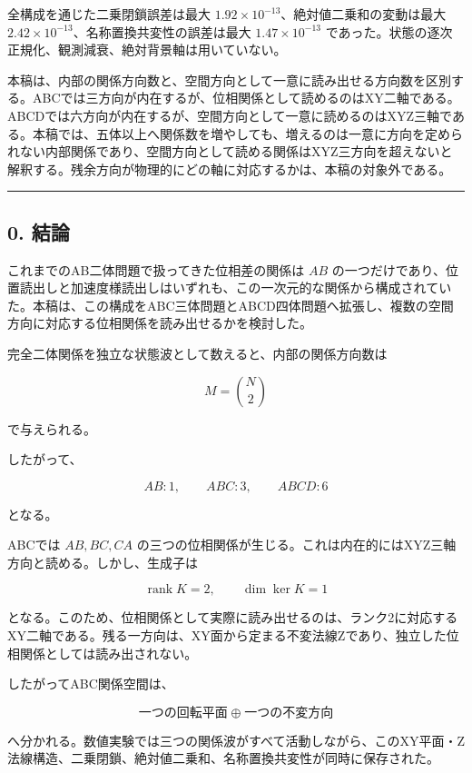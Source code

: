 \documentclass[
  10pt,
  a4paper,
]{article}
\begin{document}
全構成を通じた二乗閉鎖誤差は最大
\(1.92\times10^{-13}\)、絶対値二乗和の変動は最大
\(2.42\times10^{-13}\)、名称置換共変性の誤差は最大
\(1.47\times10^{-13}\)
であった。状態の逐次正規化、観測減衰、絶対背景軸は用いていない。

本稿は、内部の関係方向数と、空間方向として一意に読み出せる方向数を区別する。ABCでは三方向が内在するが、位相関係として読めるのはXY二軸である。ABCDでは六方向が内在するが、空間方向として一意に読めるのはXYZ三軸である。本稿では、五体以上へ関係数を増やしても、増えるのは一意に方向を定められない内部関係であり、空間方向として読める関係はXYZ三方向を超えないと解釈する。残余方向が物理的にどの軸に対応するかは、本稿の対象外である。

\begin{center}\rule{0.5\linewidth}{0.5pt}\end{center}

\subsection{0. 結論}\label{ux7d50ux8ad6}

これまでのAB二体問題で扱ってきた位相差の関係は \(AB\)
の一つだけであり、位置読出しと加速度様読出しはいずれも、この一次元的な関係から構成されていた。本稿は、この構成をABC三体問題とABCD四体問題へ拡張し、複数の空間方向に対応する位相関係を読み出せるかを検討した。

完全二体関係を独立な状態波として数えると、内部の関係方向数は

\[
M=\binom{N}{2}
\]

で与えられる。

したがって、

\[
AB:1,
\qquad
ABC:3,
\qquad
ABCD:6
\]

となる。

ABCでは \(AB,BC,CA\)
の三つの位相関係が生じる。これは内在的にはXYZ三軸方向と読める。しかし、生成子は

\[
\operatorname{rank}K=2,
\qquad
\dim\ker K=1
\]

となる。このため、位相関係として実際に読み出せるのは、ランク2に対応するXY二軸である。残る一方向は、XY面から定まる不変法線Zであり、独立した位相関係としては読み出されない。

したがってABC関係空間は、

\[
\boxed{
\text{一つの回転平面}
\;\oplus\;
\text{一つの不変方向}
}
\]

へ分かれる。数値実験では三つの関係波がすべて活動しながら、このXY平面・Z法線構造、二乗閉鎖、絶対値二乗和、名称置換共変性が同時に保存された。
\end{document}
